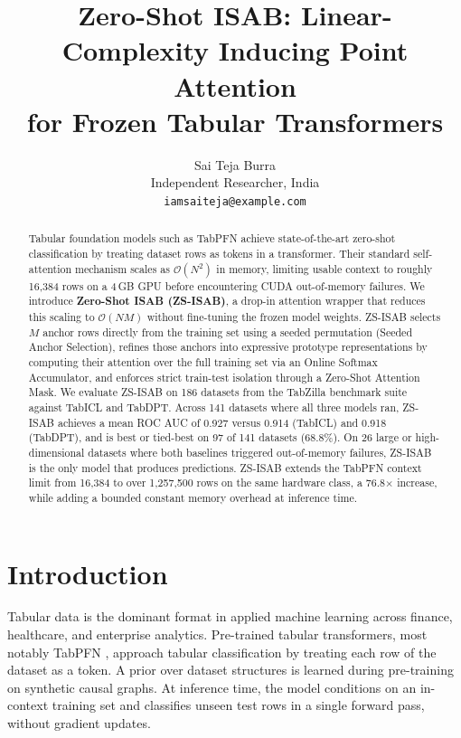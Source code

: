 \documentclass{article}
\title{Zero-Shot ISAB: Linear-Complexity Inducing Point Attention\\for Frozen Tabular Transformers}
\author{\name Sai Teja Burra \\
      \addr Independent Researcher, India \\
      \texttt{iamsaiteja@example.com}}
\begin{document}
\maketitle

\begin{abstract}
Tabular foundation models such as TabPFN achieve state-of-the-art zero-shot classification by treating dataset rows as tokens in a transformer. Their standard self-attention mechanism scales as $\mathcal{O}(N^2)$ in memory, limiting usable context to roughly 16{,}384 rows on a 4\,GB GPU before encountering CUDA out-of-memory failures. We introduce \textbf{Zero-Shot ISAB (ZS-ISAB)}, a drop-in attention wrapper that reduces this scaling to $\mathcal{O}(NM)$ without fine-tuning the frozen model weights. ZS-ISAB selects $M$ anchor rows directly from the training set using a seeded permutation (Seeded Anchor Selection), refines those anchors into expressive prototype representations by computing their attention over the full training set via an Online Softmax Accumulator, and enforces strict train-test isolation through a Zero-Shot Attention Mask. We evaluate ZS-ISAB on 186 datasets from the TabZilla benchmark suite against TabICL and TabDPT. Across 141 datasets where all three models ran, ZS-ISAB achieves a mean ROC AUC of 0.927 versus 0.914 (TabICL) and 0.918 (TabDPT), and is best or tied-best on 97 of 141 datasets (68.8\%). On 26 large or high-dimensional datasets where both baselines triggered out-of-memory failures, ZS-ISAB is the only model that produces predictions. ZS-ISAB extends the TabPFN context limit from 16{,}384 to over 1{,}257{,}500 rows on the same hardware class, a 76.8$\times$ increase, while adding a bounded constant memory overhead at inference time.
\end{abstract}

\section{Introduction}

Tabular data is the dominant format in applied machine learning across finance, healthcare, and enterprise analytics. Pre-trained tabular transformers, most notably TabPFN \citep{hollmann2022tabpfn}, approach tabular classification by treating each row of the dataset as a token. A prior over dataset structures is learned during pre-training on synthetic causal graphs. At inference time, the model conditions on an in-context training set and classifies unseen test rows in a single forward pass, without gradient updates.
\end{document}
